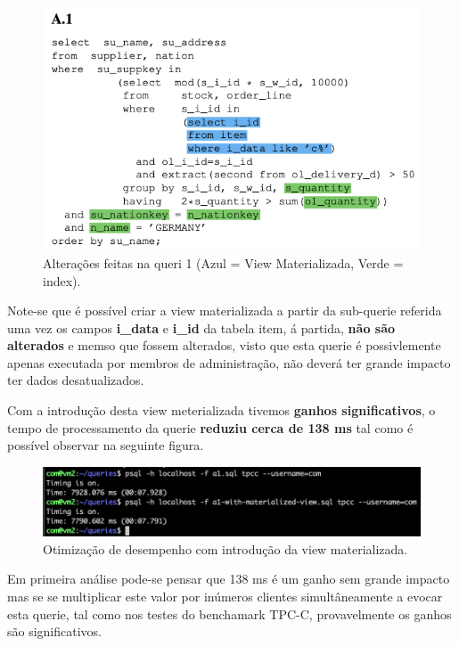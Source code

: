 \begin{figure}[H]
    \centering
    \includegraphics[scale=0.5]{imagens/q1.png}
    \caption{Alterações feitas na queri 1 (Azul = View Materializada, Verde = index).}
    \label{fig:exemplo}
\end{figure}

\hspace{5mm} Note-se que é possível criar a view materializada a partir da sub-querie referida uma vez os campos \textbf{i\_data} e \textbf{i\_id} da tabela item, á partida, \textbf{não são alterados} e memso que fossem alterados, visto que esta querie é possivlemente apenas executada por membros de administração, não deverá ter grande impacto ter dados desatualizados.

\hspace{5mm} Com a introdução desta view meterializada tivemos \textbf{ganhos significativos}, o tempo de processamento da querie \textbf{reduziu cerca de 138 ms} tal como é possível observar na seguinte figura.

\begin{figure}[H]
    \centering
    \includegraphics[scale=0.5]{imagens/q1_view_mat.png}
   \caption{Otimização de desempenho com introdução da view materializada.}
    \label{fig:exemplo}
\end{figure}

\hspace{5mm} Em primeira análise pode-se pensar que 138 ms é um ganho sem grande impacto mas se se multiplicar este valor por inúmeros clientes simultâneamente a evocar esta querie, tal como nos testes do benchamark TPC-C, provavelmente os ganhos são significativos.

